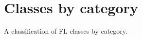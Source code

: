 \chapter{Classes by category}\label{classesbycat}
%
\setfooter{\thepage}{}{}{}{}{\thepage}%

A classification of FL classes by category.
\twocolwidtha{5cm}

\begin{comment}
{\large {\bf Service classes}}

\overview{wxMPService class overview}{wxmpserviceoverview}

Service classes reduce the diversity of PMF classes, by making
them comply to a common interface. A service class serves as an interface (or
mix-in class in C++ terms), which cannot itself represent an
independent object. It should be inherited as a second (or
third) base class.

Derived services classes all derive from wxEvtHandler as well as
wxPMService.

\begin{twocollist}\itemsep=0pt
\twocolitem{\helpref{wxPMService}{wxpmservice}}{Base class}
\twocolitem{\helpref{wxPMBootstrapService}{wxpmbootstrapservice}}{Boot strap service}
\twocolitem{\helpref{wxPMLAlgorithm}{wxpmlalgorithm}}{Layout algorithm service}
\twocolitem{\helpref{wxPMSashLayoutAlgorithm}{wxpmsashlayoutalgorithm}}{Sash layout algorithm service}
\twocolitem{\helpref{wxPMPane}{wxpmpane}}{Base class for panes lying outside the MDI client area}
\end{twocollist}
\end{comment}

